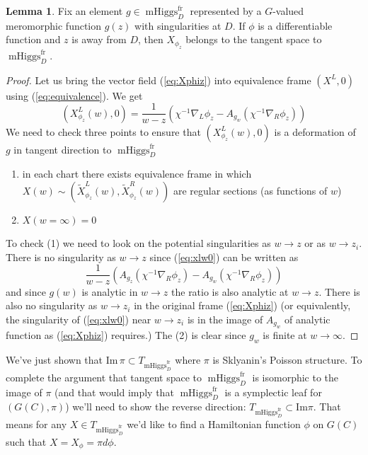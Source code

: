 \documentclass[11pt, oneside, reqno]{amsart}
\theoremstyle{definition} \newtheorem{definition}{Definition}[section]
\newtheorem{lemma}[definition]{Lemma}
\theoremstyle{definition} \newtheorem{remark}[definition]{Remark}
\theoremstyle{definition} \newtheorem{remarks}[definition]{Remarks}
\theoremstyle{definition} \newtheorem{question}[definition]{Question}
\theoremstyle{definition} \newtheorem*{note}{Note}
\theoremstyle{definition} \newtheorem{example}[definition]{Example}
\theoremstyle{definition} \newtheorem{examples}[definition]{Examples}
\DeclareMathOperator{\mhiggs}{mHiggs}
\newcommand{\fr}{\mathrm{fr}}
\begin{document}
\begin{lemma}\label{phitoX}
  Fix an element $g \in \mhiggs^{\fr}_{D}$ represented by a $G$-valued
  meromorphic function $g(z)$ with singularities at $D$.    If $\phi$ is a differentiable function and $z$ is away from $D$, then $X_{\phi_z}$
  belongs to the tangent space to $\mhiggs^{\fr}_{D}$. 
\end{lemma}
\begin{proof}
  Let us bring the vector field (\ref{eq:Xphiz}) into equivalence frame $(X^{L}, 0)$ using
  (\ref{eq:equivalence}). We get
  \begin{equation}
\label{eq:xlw0}
(X^L_{\phi_z} (w) , 0) =  \frac{1}{w - z} ( \chi^{-1} \nabla_{L} \phi_z  - A_{g_{w}} (\chi^{-1}\nabla_{R} \phi_{z}))
  \end{equation}
  We need to check three points to ensure that $(X^L_{\phi_z} (w) , 0) $ is a deformation
  of $g$ in tangent direction to $\mhiggs^{\fr}_{D}$
  \begin{enumerate}
  \item in each chart there exists equivalence frame in which $X(w) \sim (\tilde X_{\phi_{z}}^{L}(w), \tilde X_{\phi_{z}}^{R}(w))$  are regular sections (as functions of $w$)
  \item $X(w = \infty) = 0$
  \end{enumerate}
  To check (1) we need to look on the potential singularities as $w \to z$ or as $w \to z_i$.
  There is no singularity as $w \to z$ since (\ref{eq:xlw0}) can be written
  as
  \begin{equation}
    \frac{1}{w - z} ( A_{g_z}( \chi^{-1} \nabla_{R} \phi_z)  - A_{g_{w}} (\chi^{-1}\nabla_{R} \phi_{z}))
  \end{equation}
  and since $g(w)$ is analytic in $w \to z$ the ratio is also analytic at $w \to z$.
  There is also no singularity as $w \to z_i$ in the original frame (\ref{eq:Xphiz}) 
  (or equivalently, the singularity of (\ref{eq:xlw0}) near $w \to z_i$ 
  is in the image of $A_{g_{w}}$ of analytic function as (\ref{eq:Xphiz}) requires.)
 The (2) is clear since $g_{w}$ is finite at $w \to \infty$. 
\end{proof}

We've just shown that $\mathrm{Im} \, \pi \subset T_{\mhiggs^{\fr}_{D}}$ where
$\pi$ is Sklyanin's Poisson structure. To complete the argument that
tangent space to $\mhiggs^{\fr}_{D}$ is isomorphic to the image of $\pi$ (and that would
imply that $\mhiggs^{\fr}_{D}$ is a symplectic leaf for $(G(C), \pi)$) we'll
need to show the reverse direction: $T_{\mhiggs^{\fr}_{D}} \subset \mathrm{Im} \pi$.
That means for any $X \in T_{\mhiggs^{\fr}_{D}} $ we'd like to find a Hamiltonian
function $\phi$ on $G(C)$ such that $X = X_{\phi} = \pi d \phi$.
\end{document}
